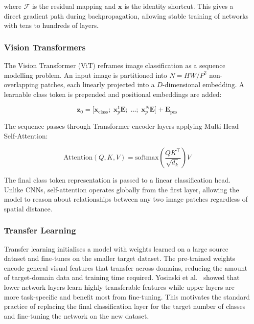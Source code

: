 \documentclass[12pt, letterpaper]{article}
\begin{document}
where $\mathcal{F}$ is the residual mapping and $\mathbf{x}$ is the identity shortcut.
This gives a direct gradient path during backpropagation, allowing stable training of networks with tens to hundreds of layers.

\subsubsection{Vision Transformers}

The Vision Transformer (ViT) \cite{dosovitskiy2021vit} reframes image classification as a sequence modelling problem. An input image is partitioned into $N = HW/P^2$ non-overlapping patches, each linearly projected into a $D$-dimensional embedding.
A learnable class token is prepended and positional embeddings are added:

\begin{equation}
    \mathbf{z}_0 = \bigl[\mathbf{x}_{\text{class}};\;
    \mathbf{x}_p^1 \mathbf{E};\; \ldots;\; \mathbf{x}_p^N \mathbf{E}\bigr]
    + \mathbf{E}_{\text{pos}}
    \label{eq:vit_input}
\end{equation}

The sequence passes through Transformer encoder layers applying Multi-Head
Self-Attention:

\begin{equation}
    \text{Attention}(Q, K, V) =
    \text{softmax}\!\left(\frac{QK^\top}{\sqrt{d_k}}\right) V
    \label{eq:attention}
\end{equation}

The final class token representation is passed to a linear classification head.
Unlike CNNs, self-attention operates globally from the first layer, allowing the model to reason about relationships between any two image patches regardless of spatial distance.

\subsubsection{Transfer Learning}

Transfer learning initialises a model with weights learned on a large source dataset and fine-tunes on the smaller target dataset. The pre-trained weights encode general visual features that transfer across domains, reducing the amount of target-domain data and training time required. Yosinski et al.\ \cite{yosinski2014transferable}
showed that lower network layers learn highly transferable features while
upper layers are more task-specific and benefit most from fine-tuning. This motivates the standard practice of replacing the final classification layer for the target number of classes and fine-tuning the network on the new dataset.
\end{document}
